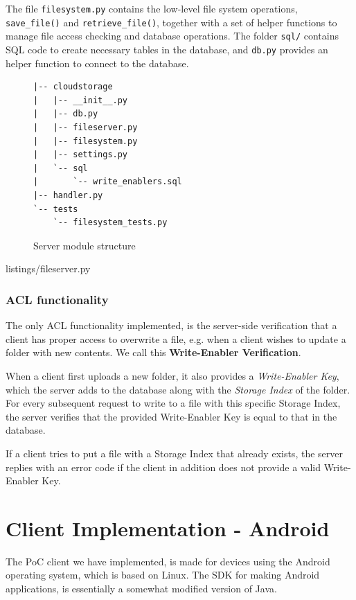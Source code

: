 \documentclass[pdftex,english,10pt,b5paper,twoside]{book}
\begin{document}
The file \texttt{filesystem.py} contains the low-level file system operations,
\texttt{save\_file()} and \texttt{retrieve\_file()}, together with a set of
helper functions to manage file access checking and database operations.  The
folder \texttt{sql/} contains \ac{SQL} code to create necessary tables in the
database, and \texttt{db.py} provides an helper function to connect to the
database.

\begin{figure}[h!]
\begin{verbatim}
|-- cloudstorage
|   |-- __init__.py
|   |-- db.py
|   |-- fileserver.py
|   |-- filesystem.py
|   |-- settings.py
|   `-- sql
|       `-- write_enablers.sql
|-- handler.py
`-- tests
    `-- filesystem_tests.py
\end{verbatim}
    \caption{Server module structure}
    \label{fig:IM:layout}
\end{figure}


{listings/fileserver.py}

\subsubsection{\acs{ACL} functionality}

The only \ac{ACL} functionality implemented, is the server-side verification
that a client has proper access to overwrite a file, e.g. when a client wishes to
update a folder with new contents. We call this \textbf{Write-Enabler Verification}.

When a client first uploads a new folder, it also provides a
\emph{Write-Enabler Key}, which the server adds to the database along with the
\emph{Storage Index} of the folder.  For every subsequent request to write to a
file with this specific Storage Index, the server verifies that the provided
Write-Enabler Key is equal to that in the database.

If a client tries to put a file with a Storage Index that already exists, the
server replies with an error code if the client in addition does not provide a
valid Write-Enabler Key.

\section{Client Implementation - Android}
%
The \ac{PoC} client we have implemented, is made for devices using the Android
operating system, which is based on Linux. The \ac{SDK} for making Android
applications, is essentially a somewhat modified version of Java.
\end{document}

